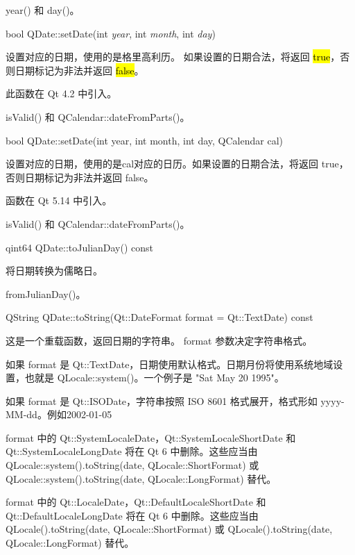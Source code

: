 \begin{notice}[另请参阅]
 year() 和 day()。
\end{notice}

\splitLine

bool QDate::setDate(int \emph{year}, int  \emph{month}, int \emph{day})

设置对应的日期，使用的是格里高利历。 如果设置的日期合法，将返回
\hl{true}，否则日期标记为非法并返回 \hl{false}。

此函数在 Qt 4.2 中引入。


\begin{notice}[另请参阅]
isValid() 和 QCalendar::dateFromParts()。
\end{notice}

\splitLine

bool QDate::setDate(int year, int month, int day, QCalendar cal)

设置对应的日期，使用的是cal对应的日历。如果设置的日期合法，将返回 true，否则日期标记为非法并返回 false。

函数在 Qt 5.14 中引入。



\begin{notice}[另请参阅]
isValid() 和 QCalendar::dateFromParts()。
\end{notice}

\splitLine

qint64 QDate::toJulianDay() const

将日期转换为儒略日。


\begin{notice}[另请参阅]
fromJulianDay()。
\end{notice}

\splitLine

QString QDate::toString(Qt::DateFormat format = Qt::TextDate) const

这是一个重载函数，返回日期的字符串。 format 参数决定字符串格式。

如果 format 是 Qt::TextDate，日期使用默认格式。日期月份将使用系统地域设置，也就是 QLocale::system()。一个例子是 "Sat May 20 1995"。

如果 format 是 Qt::ISODate，字符串按照 ISO 8601 格式展开，格式形如 yyyy-MM-dd。例如2002-01-05

format 中的 Qt::SystemLocaleDate，Qt::SystemLocaleShortDate 和Qt::SystemLocaleLongDate 将在 Qt 6 中删除。这些应当由 QLocale::system().toString(date, QLocale::ShortFormat) 或 QLocale::system().toString(date, QLocale::LongFormat) 替代。

format 中的 Qt::LocaleDate，Qt::DefaultLocaleShortDate 和Qt::DefaultLocaleLongDate 将在 Qt 6 中删除。这些应当由 QLocale().toString(date, QLocale::ShortFormat) 或 QLocale().toString(date, QLocale::LongFormat) 替代。

